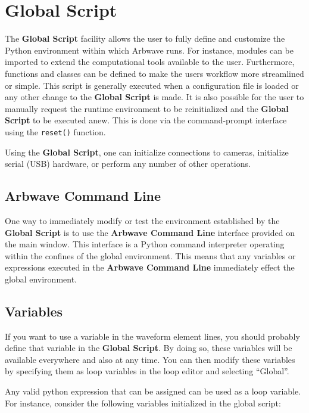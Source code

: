 \thispagestyle{fancy}
\pagestyle{fancy}

\section{Global Script}
The \textbf{Global Script} facility allows the user to fully define and
customize the Python environment within which Arbwave runs.  For instance,
modules can be imported to extend the computational tools available to the user.
Furthermore, functions and classes can be defined to make the users workflow
more streamlined or simple.  This script is generally executed when a
configuration file is loaded or any other change to the \textbf{Global Script}
is made.  It is also possible for the user to manually request the runtime
environment to be reinitialized and the \textbf{Global Script} to be executed
anew.  This is done via the command-prompt interface using the \texttt{reset()}
function.

Using the \textbf{Global Script}, one can initialize connections to cameras,
initialize serial (USB) hardware, or perform any number of other operations.

\subsection{Arbwave Command Line}
One way to immediately modify or test the environment established by the
\textbf{Global Script} is to use the \textbf{Arbwave Command Line} interface
provided on the main window.  This interface is a Python command interpreter
operating within the confines of the global environment.  This means that any
variables or expressions executed in the \textbf{Arbwave Command Line}
immediately effect the global environment.

\subsection{Variables} \label{script:variables}
If you want to use a variable in the waveform element lines, you should
probably define that variable in the \textbf{Global Script}.  By
doing so, these variables will be available everywhere and also at any time.
You can then modify these variables by specifying them as loop variables in
the loop editor and selecting ``Global''.

Any valid python expression that can be assigned can be used as a loop
variable.  For instance, consider the following variables initialized in the
global script:

